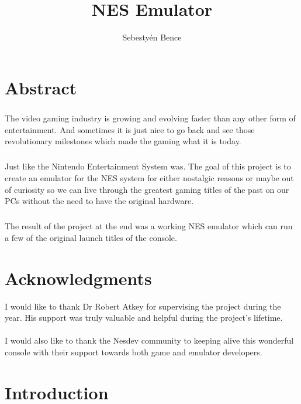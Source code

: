 \documentclass[]{report}
\title{NES Emulator}
\author{Sebestyén Bence}
\begin{document}
	
\chapter*{Abstract}
\paragraph{ }
The video gaming industry is growing and evolving faster than any other form of entertainment. And sometimes it is just nice to go back and see those revolutionary milestones which made the gaming what it is today. 
\paragraph{ }
Just like the Nintendo Entertainment System was. The goal of this project is to create an emulator for the NES system for either nostalgic reasons or maybe out of curiosity so we can live through the greatest gaming titles of the past on our PCs without the need to have the original hardware.
\paragraph{ }
The result of the project at the end was a working NES emulator which can run a few of the original launch titles of the console.

\pagebreak

\chapter*{Acknowledgments}
I would like to thank Dr Robert Atkey for supervising the project during the year. His support was truly valuable and helpful during the project's lifetime.
\\
\\
I would also like to thank the Nesdev community to keeping alive this wonderful console with their support towards both game and emulator developers.
\pagebreak


\tableofcontents

\clearpage

\chapter{Introduction}
\end{document}
